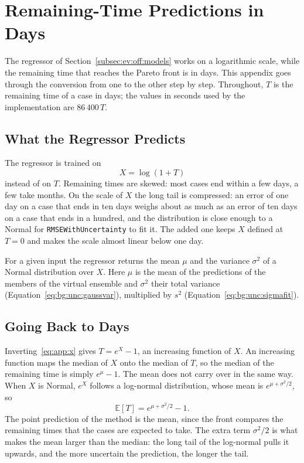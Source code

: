 \chapter{Remaining-Time Predictions in Days}
\label{app:lognormal}
The regressor of Section~\ref{subsec:ev:off:models} works on a logarithmic
scale, while the remaining time that reaches the Pareto front is in days.
This appendix goes through the conversion from one to the other step by step.
Throughout, $T$ is the remaining time of a case in days; the values in
seconds used by the implementation are $86\,400\,T$.

\section{What the Regressor Predicts}
The regressor is trained on
\begin{equation}
  X = \log(1 + T)
  \label{eq:app:x}
\end{equation}
instead of on $T$. Remaining times are skewed: most cases end within a few
days, a few take months. On the scale of $X$ the long tail is compressed:
an error of one day on a case that ends in ten days weighs about as much as
an error of ten days on a case that ends in a hundred, and the
distribution is close enough to a Normal for \texttt{RMSEWithUncertainty} to
fit it. The added one keeps $X$ defined at $T = 0$ and makes the scale almost
linear below one day.

For a given input the regressor returns the mean $\mu$ and the variance
$\sigma^2$ of a Normal distribution over $X$. Here $\mu$ is the mean of the
predictions of the members of the virtual ensemble and $\sigma^2$ their total
variance (Equation~\eqref{eq:bg:unc:gaussvar}), multiplied by $s^2$
(Equation~\eqref{eq:bg:unc:sigmafit}).

\section{Going Back to Days}
Inverting~\eqref{eq:app:x} gives $T = e^X - 1$, an increasing function of
$X$. An increasing function maps the median of $X$ onto the median of $T$,
so the median of the remaining time is simply $e^{\mu} - 1$. The mean does
not carry over in the same way. When $X$ is Normal, $e^X$ follows a
log-normal distribution, whose mean is $e^{\mu + \sigma^2/2}$, so
\begin{equation}
  \mathbb{E}[T] = e^{\mu + \sigma^2 / 2} - 1 .
  \label{eq:app:plainmean}
\end{equation}
The point prediction of the method is the mean, since the front compares
the remaining times that the cases are expected to take. The extra term
$\sigma^2/2$ is what makes the mean larger than the median: the long tail of
the log-normal pulls it upwards, and the more uncertain the prediction, the
longer the tail.

